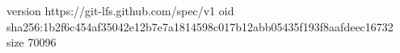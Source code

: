 version https://git-lfs.github.com/spec/v1
oid sha256:1b2f6c454af35042e12b7e7a1814598c017b12abb05435f193f8aafdeec16732
size 70096
